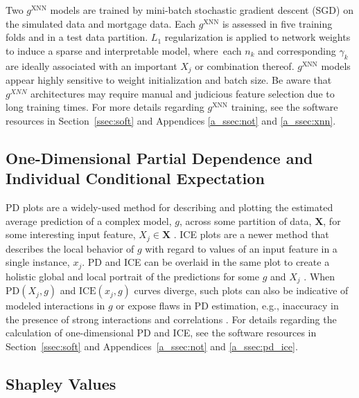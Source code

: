 \documentclass[information,article,accept,moreauthors,pdftex]{Definitions/mdpi}
\begin{document}
{{Two $g^\text{XNN}$ models are trained by mini-batch stochastic gradient descent (SGD) on the simulated data and mortgage data. Each $g^\text{XNN}$ is assessed in five training folds and in a test data partition. $L_1$ regularization is applied to network weights to induce a sparse and interpretable model, where~each $n_k$ and corresponding $\gamma_k$ are ideally associated with an important $X_j$ or combination thereof. $g^\text{XNN}$ models appear highly sensitive to weight initialization and batch size. Be aware that $g^{XNN}$ architectures may require manual and judicious feature selection due to long training times. For more details regarding $g^\text{XNN}$ training, see the software resources in Section~\ref{ssec:soft} and Appendices  \ref{a_ssec:not} and \ref{a_ssec:xnn}.

\subsection{One-Dimensional Partial Dependence and Individual Conditional Expectation}\label{ssec:pd_ice}

PD plots are a widely-used method for describing and plotting the estimated average prediction of a complex model, $g$, across some partition of data, $\mathbf{X}$, for some interesting input feature, $X_j \in \mathbf{X}$ \cite{esl}. ICE plots are a newer method that describes the local behavior of $g$ with regard to values of an input feature in a single instance, $x_j$. PD and ICE can be overlaid in the same plot to create a holistic global and local portrait of the predictions for some $g$ and $X_j$ \cite{ice_plots}. When $\text{PD}(X_j, g)$ and $\text{ICE}(x_j,  g)$ curves diverge, such plots can also be indicative of modeled interactions in $g$ or expose flaws in PD estimation, e.g., inaccuracy in the presence of strong interactions and correlations \cite{ice_plots,ale_plot}.  For details regarding the calculation of one-dimensional PD and ICE, see the software resources in Section~\ref{ssec:soft} and Appendices~\ref{a_ssec:not} and \ref{a_ssec:pd_ice}.

\subsection{Shapley Values}\label{ssec:shap}

}}
\end{document}
